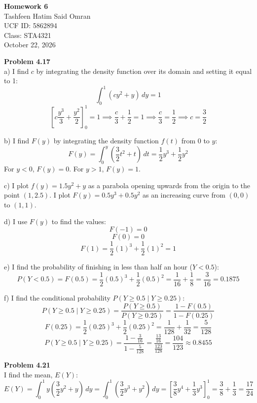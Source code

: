 \documentclass[11pt]{article}
\begin{document}
\begin{center}
\textbf{\Large Homework 6} \\
Tashfeen Hatim Said Omran \\
UCF ID: 5862894 \\
Class: STA4321 \\
October 22, 2026
\end{center}

\vspace{0.5cm}

\noindent \textbf{Problem 4.17} \\
a) I find $c$ by integrating the density function over its domain and setting it equal to 1:
\[ \int_{0}^{1} (cy^2 + y) \, dy = 1 \]
\[ \left[ c\frac{y^3}{3} + \frac{y^2}{2} \right]_0^1 = 1 \implies \frac{c}{3} + \frac{1}{2} = 1 \implies \frac{c}{3} = \frac{1}{2} \implies c = \frac{3}{2} \]

\noindent b) I find $F(y)$ by integrating the density function $f(t)$ from $0$ to $y$:
\[ F(y) = \int_{0}^{y} \left( \frac{3}{2}t^2 + t \right) \, dt = \frac{1}{2}y^3 + \frac{1}{2}y^2 \]
For $y < 0$, $F(y) = 0$. For $y > 1$, $F(y) = 1$.

\noindent c) I plot $f(y) = 1.5y^2 + y$ as a parabola opening upwards from the origin to the point $(1, 2.5)$. I plot $F(y) = 0.5y^3 + 0.5y^2$ as an increasing curve from $(0,0)$ to $(1,1)$. 

\noindent d) I use $F(y)$ to find the values:
\[ F(-1) = 0 \]
\[ F(0) = 0 \]
\[ F(1) = \frac{1}{2}(1)^3 + \frac{1}{2}(1)^2 = 1 \]

\noindent e) I find the probability of finishing in less than half an hour ($Y < 0.5$):
\[ P(Y < 0.5) = F(0.5) = \frac{1}{2}(0.5)^3 + \frac{1}{2}(0.5)^2 = \frac{1}{16} + \frac{1}{8} = \frac{3}{16} = 0.1875 \]

\noindent f) I find the conditional probability $P(Y \ge 0.5 \mid Y \ge 0.25)$:
\[ P(Y \ge 0.5 \mid Y \ge 0.25) = \frac{P(Y \ge 0.5)}{P(Y \ge 0.25)} = \frac{1 - F(0.5)}{1 - F(0.25)} \]
\[ F(0.25) = \frac{1}{2}(0.25)^3 + \frac{1}{2}(0.25)^2 = \frac{1}{128} + \frac{1}{32} = \frac{5}{128} \]
\[ P(Y \ge 0.5 \mid Y \ge 0.25) = \frac{1 - \frac{3}{16}}{1 - \frac{5}{128}} = \frac{\frac{13}{16}}{\frac{123}{128}} = \frac{104}{123} \approx 0.8455 \]

\vspace{0.5cm}
\noindent \textbf{Problem 4.21} \\
I find the mean, $E(Y)$:
\[ E(Y) = \int_{0}^{1} y \left( \frac{3}{2}y^2 + y \right) \, dy = \int_{0}^{1} \left( \frac{3}{2}y^3 + y^2 \right) \, dy = \left[ \frac{3}{8}y^4 + \frac{1}{3}y^3 \right]_0^1 = \frac{3}{8} + \frac{1}{3} = \frac{17}{24} \]
\end{document}
